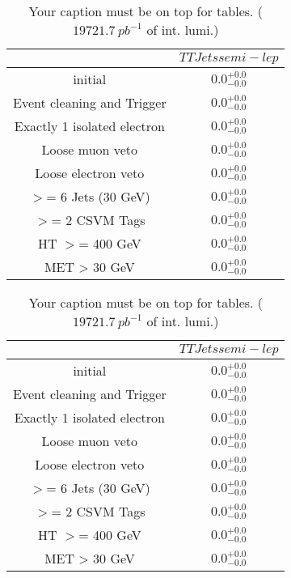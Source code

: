 \documentclass{article}
\begin{document}
\begin{landscape}
\begin{table}
\caption{Your caption must be on top for tables. ($19721.7~pb^{-1}$ of int. lumi.)}
\label{tab:}
\centering
\begin{tabular}{|c|c|}
\toprule
&$TTJets semi-lep$	\\

\midrule
initial&	$0.0^{+0.0}_{-0.0}$	\\

Event cleaning and Trigger&	$0.0^{+0.0}_{-0.0}$	\\

Exactly 1 isolated electron&	$0.0^{+0.0}_{-0.0}$	\\

Loose muon veto&	$0.0^{+0.0}_{-0.0}$	\\

Loose electron veto&	$0.0^{+0.0}_{-0.0}$	\\

$>$= 6 Jets (30 GeV)&	$0.0^{+0.0}_{-0.0}$	\\

$>$= 2 CSVM Tags&	$0.0^{+0.0}_{-0.0}$	\\

HT $>$=  400 GeV&	$0.0^{+0.0}_{-0.0}$	\\

MET > 30 GeV&	$0.0^{+0.0}_{-0.0}$	\\

\bottomrule
\end{tabular}
\end{table}
\end{landscape}
\begin{landscape}
\begin{table}
\caption{Your caption must be on top for tables. ($19721.7~pb^{-1}$ of int. lumi.)}
\label{tab:}
\centering
\begin{tabular}{|c|c|}
\toprule
&$TTJets semi-lep$	\\

\midrule
initial&	$0.0^{+0.0}_{-0.0}$	\\

Event cleaning and Trigger&	$0.0^{+0.0}_{-0.0}$	\\

Exactly 1 isolated electron&	$0.0^{+0.0}_{-0.0}$	\\

Loose muon veto&	$0.0^{+0.0}_{-0.0}$	\\

Loose electron veto&	$0.0^{+0.0}_{-0.0}$	\\

$>$= 6 Jets (30 GeV)&	$0.0^{+0.0}_{-0.0}$	\\

$>$= 2 CSVM Tags&	$0.0^{+0.0}_{-0.0}$	\\

HT $>$=  400 GeV&	$0.0^{+0.0}_{-0.0}$	\\

MET > 30 GeV&	$0.0^{+0.0}_{-0.0}$	\\

\bottomrule
\end{tabular}
\end{table}
\end{landscape}
\end{document}
